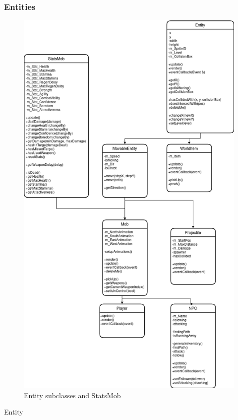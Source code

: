 \documentclass{article}
\begin{document}
            \subsubsection{Entities}
                \begin{figure}[hbt!]
                    \centerline{\includegraphics[scale=0.5]{img/Classes/Entities.png}}
                    \caption{Entity subclasses and StatsMob}
                    \label{fig}
                \end{figure}
                Entity
\end{document}
